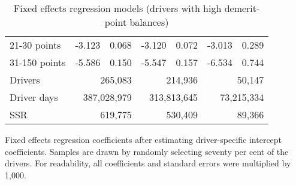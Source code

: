 \begin{table}
\begin{tabular}{l r r r r r r}
21-30 points  & -3.123  &  0.068  & -3.120  &  0.072  & -3.013  &  0.289   \\ 
 
31-150 points  & -5.586  &  0.150  & -5.547  &  0.157  & -6.534  &  0.744   \\ 
 

\hline 
 

Drivers 
 & \multicolumn{2}{r}{265,083}  & \multicolumn{2}{r}{214,936}  & \multicolumn{2}{r}{50,147}   \\ 
 

Driver days 
 & \multicolumn{2}{r}{387,028,979}  & \multicolumn{2}{r}{313,813,645}  & \multicolumn{2}{r}{73,215,334}   \\ 
 

SSR 
 & \multicolumn{2}{r}{619,775}  & \multicolumn{2}{r}{530,409}  & \multicolumn{2}{r}{89,366}   \\ 
 

\hline 
 
\end{tabular} 
\caption{Fixed effects regression models (drivers with high demerit-point balances)} 
Fixed effects regression coefficients after estimating driver-specific intercept coefficients. 
Samples are drawn by randomly selecting seventy per cent of the drivers. 
For readability, all coefficients and standard errors were multiplied by 1,000.
\label{tab:FE_regs_high_pts} 
\end{table} 
 

